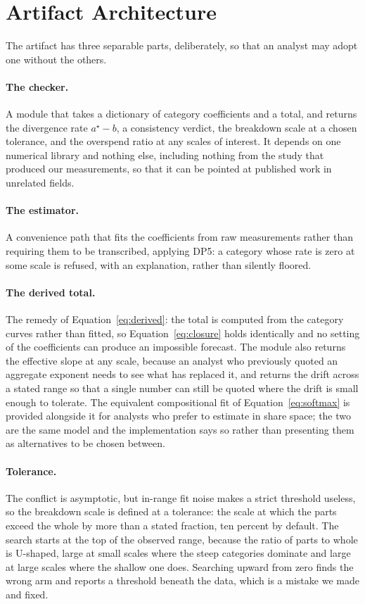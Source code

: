 \documentclass[11pt]{article}
\begin{document}
\section{Artifact Architecture}
\label{sec:arch}

The artifact has three separable parts, deliberately, so that an analyst may adopt
one without the others.

\paragraph{The checker.}
A module that takes a dictionary of category coefficients and a total, and returns
the divergence rate $a^\star - b$, a consistency verdict, the breakdown scale at
a chosen tolerance, and the overspend ratio at any scales of interest. It depends on
one numerical library and nothing else, including nothing from the study that
produced our measurements, so that it can be pointed at published work in unrelated
fields.

\paragraph{The estimator.}
A convenience path that fits the coefficients from raw measurements rather than
requiring them to be transcribed, applying DP5: a category whose rate is zero at
some scale is refused, with an explanation, rather than silently floored.

\paragraph{The derived total.}
The remedy of Equation~\ref{eq:derived}: the total is computed from the category
curves rather than fitted, so Equation~\ref{eq:closure} holds identically and no
setting of the coefficients can produce an impossible forecast. The module also
returns the effective slope at any scale, because an analyst who previously quoted
an aggregate exponent needs to see what has replaced it, and returns the drift
across a stated range so that a single number can still be quoted where the drift
is small enough to tolerate. The equivalent compositional fit of
Equation~\ref{eq:softmax} is provided alongside it for analysts who prefer to
estimate in share space; the two are the same model and the implementation says so
rather than presenting them as alternatives to be chosen between.

\paragraph{Tolerance.}
The conflict is asymptotic, but in-range fit noise makes a strict threshold
useless, so the breakdown scale is defined at a tolerance: the scale at which the
parts exceed the whole by more than a stated fraction, ten percent by default. The
search starts at the top of the observed range, because the ratio of parts to whole
is U-shaped, large at small scales where the steep categories dominate and large at
large scales where the shallow one does. Searching upward from zero finds the wrong
arm and reports a threshold beneath the data, which is a mistake we made and fixed.
\end{document}

